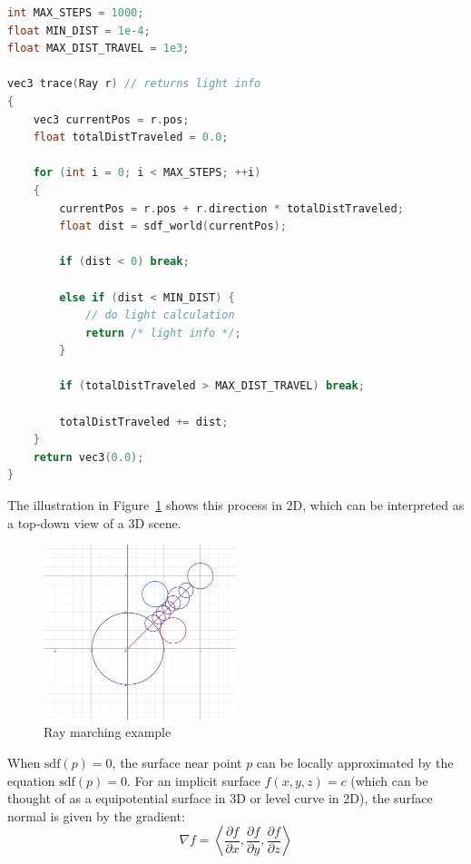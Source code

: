 \begin{lstlisting}[language=C]
int MAX_STEPS = 1000;
float MIN_DIST = 1e-4;
float MAX_DIST_TRAVEL = 1e3;

vec3 trace(Ray r) // returns light info
{
    vec3 currentPos = r.pos;
    float totalDistTraveled = 0.0;

    for (int i = 0; i < MAX_STEPS; ++i)
    {
        currentPos = r.pos + r.direction * totalDistTraveled;
        float dist = sdf_world(currentPos);

        if (dist < 0) break;

        else if (dist < MIN_DIST) {
            // do light calculation
            return /* light info */;
        }

        if (totalDistTraveled > MAX_DIST_TRAVEL) break;

        totalDistTraveled += dist;
    }
    return vec3(0.0);
}
\end{lstlisting}

The illustration in Figure~\ref{fig:raymarching_eg} shows this process in 2D, which can be interpreted as a top-down view of a 3D scene.

\begin{figure}[H]
    \centering
    \includegraphics[width=0.5\textwidth]{images/raymarching_eg.png}
    \caption{Ray marching example}
    \label{fig:raymarching_eg}
\end{figure}

When $\text{sdf}(p) = 0$, the surface near point $p$ can be locally approximated by the equation $\text{sdf}(p) = 0$. For an implicit surface $f(x, y, z) = c$ (which can be thought of as a equipotential surface in 3D or level curve in 2D), the surface normal is given by the gradient:
\[
\nabla f = \left\langle \frac{\partial f}{\partial x}, \frac{\partial f}{\partial y}, \frac{\partial f}{\partial z} \right\rangle
\]

